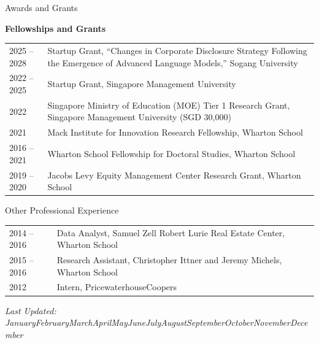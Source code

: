 \documentclass{resume} %
\begin{document}
\begin{rSection}{Awards and Grants}

{\bf Fellowships and Grants} \medskip

\begin{tabular}{p{2cm}p{15.5cm}}
2025 -- 2028 & Startup Grant, ``Changes in Corporate Disclosure Strategy Following the Emergence of Advanced Language Models,'' Sogang University \medskip \\
2022 -- 2025 & Startup Grant, Singapore Management University \medskip \\
2022 & Singapore Ministry of Education (MOE) Tier 1 Research Grant, Singapore Management University \newline (SGD 30,000) \medskip \\
2021 & Mack Institute for Innovation Research Fellowship, Wharton School \medskip \\
2016 -- 2021 & Wharton School Fellowship for Doctoral Studies, Wharton School \medskip \\
2019 -- 2020 & Jacobs Levy Equity Management Center Research Grant, Wharton School
\end{tabular}

\end{rSection}


\begin{rSection}{Other Professional Experience}

\begin{tabular}{p{2cm}p{15.5cm}}
2014 -- 2016 & Data Analyst, Samuel Zell Robert Lurie Real Estate Center, Wharton School \medskip \\
2015 -- 2016 & Research Assistant, Christopher Ittner and Jeremy Michels, Wharton School \medskip \\
2012 & Intern, PricewaterhouseCoopers
\end{tabular}

\end{rSection}


\vfill\hfill {\em Last Updated: \ifcase\month\or January\or February\or March\or April\or May\or June\or July\or August\or September\or October\or November\or December\fi~\the\year} {\parfillskip=3mm\par}
\end{document}
